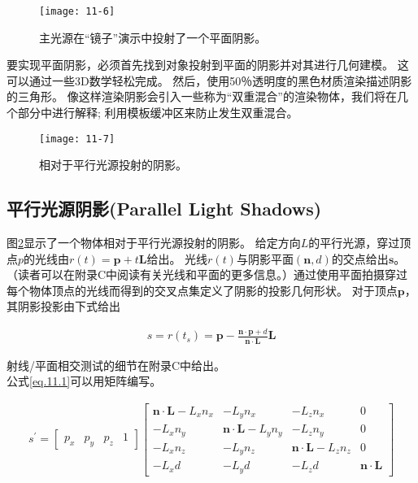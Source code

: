 \begin{figure}[h]
    \texttt{[image: 11-6]}
    \centering
    \caption{主光源在“镜子”演示中投射了一个平面阴影。}
    \label{fig:11-6}
\end{figure}

\begin{flushleft}
要实现平面阴影，必须首先找到对象投射到平面的阴影并对其进行几何建模。 这可以通过一些3D数学轻松完成。 然后，使用50％透明度的黑色材质渲染描述阴影的三角形。 像这样渲染阴影会引入一些称为“双重混合”的渲染物体，我们将在几个部分中进行解释; 利用模板缓冲区来防止发生双重混合。\\
\end{flushleft}

\begin{figure}[h]
    \texttt{[image: 11-7]}
    \centering
    \caption{相对于平行光源投射的阴影。}
    \label{fig:11-7}
\end{figure}

\subsection{平行光源阴影(Parallel Light Shadows)}
\begin{flushleft}
图\ref{fig:11-7}显示了一个物体相对于平行光源投射的阴影。 给定方向$L$的平行光源，穿过顶点$p$的光线由$r(t)=\boldsymbol{p}+t\boldsymbol{L}$给出。 光线$r(t)$与阴影平面$(\boldsymbol{n},d)$的交点给出$\boldsymbol{s}$。 （读者可以在附录C中阅读有关光线和平面的更多信息。）通过使用平面拍摄穿过每个物体顶点的光线而得到的交叉点集定义了阴影的投影几何形状。 对于顶点$\boldsymbol{p}$，其阴影投影由下式给出\\
\end{flushleft}

\begin{align*}\tag{eq.11.1}\label{eq.11.1}
s=r(t_{s})=\boldsymbol{p}-\frac{\boldsymbol{n}\cdot \boldsymbol{p}+d}{\boldsymbol{n}\cdot \boldsymbol{L}}\boldsymbol{L}
\end{align*}

\begin{flushleft}
射线/平面相交测试的细节在附录C中给出。\\
公式\ref{eq.11.1}可以用矩阵编写。\\
\end{flushleft}

\begin{align*}
s^{'}=\begin{bmatrix}
p_{x} & p_{y} & p_{z} & 1
\end{bmatrix}
\begin{bmatrix}
\boldsymbol{n}\cdot \boldsymbol{L}-L_{x}n_{x} & -L_{y}n_{x} & -L_{z}n_{x} & 0\\
-L_{x}n_{y} & \boldsymbol{n}\cdot \boldsymbol{L}-L_{y}n_{y} & -L_{z}n_{y} & 0\\
-L_{x}n_{z} & -L_{y}n_{z} & \boldsymbol{n}\cdot \boldsymbol{L}-L_{z}n_{z} & 0\\
-L_{x}d & -L_{y}d & -L_{z}d & \boldsymbol{n}\cdot \boldsymbol{L}
\end{bmatrix}
\end{align*}

